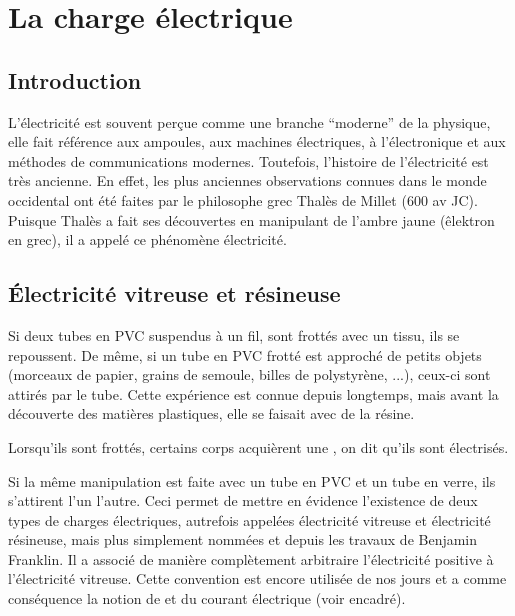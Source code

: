 

\chapter{La charge électrique}
\section{Introduction}
L'électricité est souvent perçue comme une branche \enquote{moderne} de la physique, elle fait référence aux ampoules, aux machines électriques, à l'électronique et aux méthodes de communications modernes. Toutefois, l'histoire de l'électricité est très ancienne. En effet, les plus anciennes observations connues dans le monde occidental ont été faites par le philosophe grec Thalès de Millet (600 av JC). Puisque Thalès a fait ses découvertes en manipulant de l'ambre jaune (êlektron en grec), il a appelé ce phénomène électricité.



\section{Électricité vitreuse et résineuse}
Si deux tubes en PVC suspendus à un fil, sont frottés avec un tissu, ils se repoussent. De même, si un tube en PVC frotté est approché de petits objets (morceaux de papier, grains de semoule, billes de polystyrène, ...), ceux-ci sont attirés par le tube.
Cette expérience est connue depuis longtemps, mais avant la découverte des matières plastiques, elle se faisait avec de la résine.

\begin{encadre}
    Lorsqu'ils sont frottés, certains corps acquièrent une , on dit qu'ils sont électrisés.
\end{encadre}

Si la même manipulation est faite avec un tube en PVC et un tube en verre, ils s'attirent l'un l'autre. Ceci permet de mettre en évidence l'existence de deux types de charges électriques, autrefois appelées électricité vitreuse et électricité résineuse, mais plus simplement nommées  et  depuis les travaux de Benjamin Franklin. Il a associé de manière complètement arbitraire l'électricité positive à l'électricité vitreuse. Cette convention est encore utilisée de nos jours et a comme conséquence la notion de  et  du courant électrique (voir encadré).

